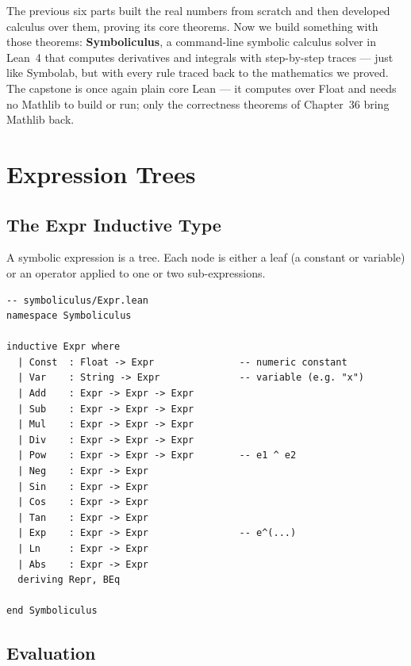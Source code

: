 \documentclass[12pt, openany]{book}
\theoremstyle{plain}
\theoremstyle{definition}
\theoremstyle{remark}
\newcommand{\li}[1]{{\ttfamily\small\color{tealaccent}#1}}
\begin{document}
The previous six parts built the real numbers from scratch and then developed
calculus over them, proving its core theorems.
Now we build something with those theorems: \textbf{Symboliculus}, a command-line
symbolic calculus solver in Lean~4 that computes derivatives and integrals with
step-by-step traces --- just like Symbolab, but with every rule
traced back to the mathematics we proved.  The capstone is once again plain
core Lean --- it computes over \li{Float} and needs no Mathlib to build or
run; only the correctness theorems of Chapter~36 bring Mathlib back.

\chapter{Expression Trees}
\color{black}

\section{The \li{Expr} Inductive Type}

A symbolic expression is a tree.  Each node is either a leaf (a constant or
variable) or an operator applied to one or two sub-expressions.

\begin{leanbox}
\begin{lstlisting}
-- symboliculus/Expr.lean
namespace Symboliculus

inductive Expr where
  | Const  : Float -> Expr               -- numeric constant
  | Var    : String -> Expr              -- variable (e.g. "x")
  | Add    : Expr -> Expr -> Expr
  | Sub    : Expr -> Expr -> Expr
  | Mul    : Expr -> Expr -> Expr
  | Div    : Expr -> Expr -> Expr
  | Pow    : Expr -> Expr -> Expr        -- e1 ^ e2
  | Neg    : Expr -> Expr
  | Sin    : Expr -> Expr
  | Cos    : Expr -> Expr
  | Tan    : Expr -> Expr
  | Exp    : Expr -> Expr                -- e^(...)
  | Ln     : Expr -> Expr
  | Abs    : Expr -> Expr
  deriving Repr, BEq

end Symboliculus
\end{lstlisting}
\end{leanbox}
\color{black}

\section{Evaluation}
\end{document}
